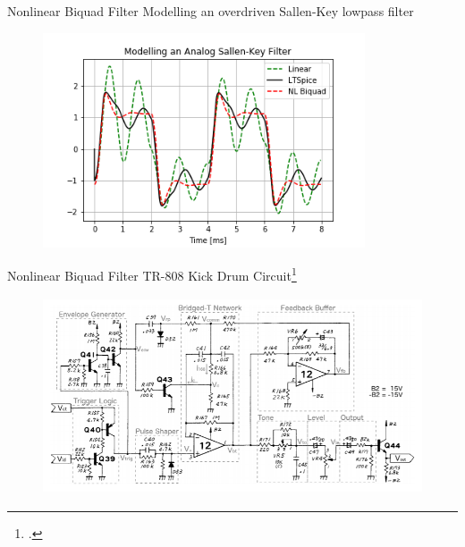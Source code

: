 \begin{frame}{Nonlinear Biquad Filter}
    Modelling an overdriven Sallen-Key lowpass filter
    \begin{figure}
        \includegraphics[height=2.5in]{../NonlinearBiquad/Pics/Spice-Compare.png}
    \end{figure}
\end{frame}

\begin{frame}{Nonlinear Biquad Filter}
    TR-808 Kick Drum Circuit\footcite[]{kurt-808}
    \begin{figure}
        \includegraphics[height=2.3in]{../NonlinearBiquad/Pics/808_Circuit.png}
    \end{figure}
\end{frame}
